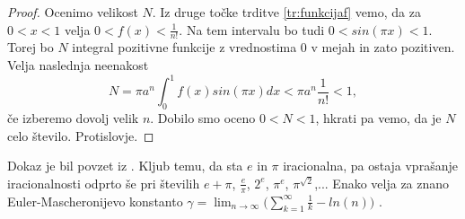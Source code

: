 \documentclass[a4paper]{article}
\theoremstyle{plain}
\begin{document}
\begin{proof}
Ocenimo velikost $N$. Iz druge točke trditve \ref{tr:funkcijaf} vemo, da za $0<x<1$ velja $0<f(x)<\frac{1}{n!}$. Na tem intervalu bo tudi $0<sin(\pi x)<1$. Torej bo $N$ integral pozitivne funkcije z vrednostima 0 v mejah in zato pozitiven. Velja naslednja neenakost
\begin{equation*}
N =  \pi a^n\int_{0}^{1}f(x)sin(\pi x)dx < \pi a^n\frac{1}{n!} <1,
\end{equation*}
če izberemo dovolj velik $n$. Dobilo smo oceno $0<N<1$, hkrati pa vemo, da je $N$ celo število. Protislovje.
\end{proof}
Dokaz je bil povzet iz \cite{dokazi}. Kljub temu, da sta $e$ in $\pi$ iracionalna, pa ostaja vprašanje iracionalnosti odprto še pri številih $e+\pi$, $\frac{e}{\pi}$, $2^e$, $\pi^e$, $\pi^{\sqrt{2}}$,... Enako velja za znano Euler-Mascheronijevo konstanto $\gamma = \lim_{n\to\infty} \big( \sum_{k=1}^{\infty}\frac{1}{k}-ln(n)\big)$ \cite{e}\cite{iracionalna}.



\end{document}
